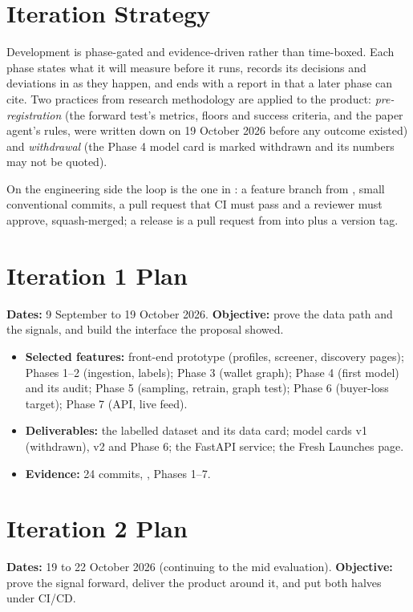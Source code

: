 \section{Iteration Strategy}
Development is phase-gated and evidence-driven rather than time-boxed. Each phase states what it will measure before it runs, records its decisions and deviations in  as they happen, and ends with a report in  that a later phase can cite. Two practices from research methodology are applied to the product: \emph{pre-registration} (the forward test's metrics, floors and success criteria, and the paper agent's rules, were written down on 19 October 2026 before any outcome existed) and \emph{withdrawal} (the Phase 4 model card is marked withdrawn and its numbers may not be quoted).

On the engineering side the loop is the one in : a feature branch from , small conventional commits, a pull request that CI must pass and a reviewer must approve, squash-merged; a release is a pull request from  into  plus a version tag.

\section{Iteration 1 Plan}
\textbf{Dates:} 9 September to 19 October 2026. \textbf{Objective:} prove the data path and the signals, and build the interface the proposal showed.

\begin{itemize}
  \item \textbf{Selected features:} front-end prototype (profiles, screener, discovery pages); Phases 1--2 (ingestion, labels); Phase 3 (wallet graph); Phase 4 (first model) and its audit; Phase 5 (sampling, retrain, graph test); Phase 6 (buyer-loss target); Phase 7 (API, live feed).
  \item \textbf{Deliverables:} the labelled dataset and its data card; model cards v1 (withdrawn), v2 and Phase 6; the FastAPI service; the Fresh Launches page.
  \item \textbf{Evidence:} 24 commits, ,  Phases 1--7.
\end{itemize}

\section{Iteration 2 Plan}
\textbf{Dates:} 19 to 22 October 2026 (continuing to the mid evaluation). \textbf{Objective:} prove the signal forward, deliver the product around it, and put both halves under CI/CD.

